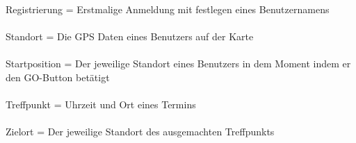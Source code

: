 Registrierung = Erstmalige Anmeldung mit festlegen eines Benutzernamens\\
\\
Standort = Die GPS Daten eines Benutzers auf der Karte\\
\\
Startposition = Der jeweilige Standort eines Benutzers in dem Moment indem er den GO-Button betätigt\\
\\
Treffpunkt = Uhrzeit und Ort eines Termins\\
\\
Zielort = Der jeweilige Standort des ausgemachten Treffpunkts\\
\\








